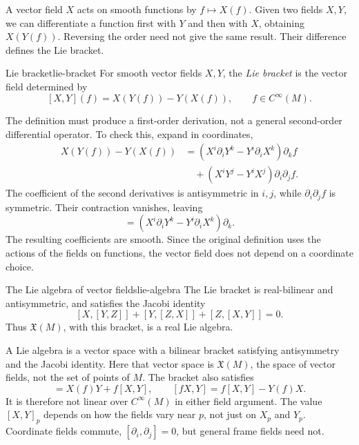 \documentclass[11pt,a4paper]{article}
\numberwithin{equation}{section}
\newcommand{\Cinf}{C^\infty}
\newcommand{\X}{\mathfrak X}
\begin{document}
A vector field \(X\) acts on smooth functions by \(f\mapsto X(f)\).
Given two fields \(X,Y\), we can differentiate a function first with
\(Y\) and then with \(X\), obtaining \(X(Y(f))\). Reversing the order
need not give the same result. Their difference defines the Lie bracket.

\begin{definition}{Lie bracket}{lie-bracket}
For smooth vector fields \(X,Y\), the \emph{Lie bracket} is the
vector field determined by
\[
 [X,Y](f)=X(Y(f))-Y(X(f)),\qquad f\in\Cinf(M).
\]
\end{definition}

The definition must produce a first-order derivation, not a general
second-order differential operator. To check this, expand in coordinates,
\[
 \begin{aligned}
 X(Y(f))-Y(X(f))
 &=(X^i\partial_iY^k-Y^i\partial_iX^k)\partial_kf\\
 &\quad +(X^iY^j-Y^iX^j)\partial_i\partial_jf.
 \end{aligned}
\]
The coefficient of the second derivatives is antisymmetric in \(i,j\),
while \(\partial_i\partial_jf\) is symmetric. Their contraction
vanishes, leaving
\begin{equation}
 [X,Y]=(X^i\partial_iY^k-Y^i\partial_iX^k)\partial_k.
 \label{eq:bracket-components}
\end{equation}
The resulting coefficients are smooth. Since the original definition
uses the actions of the fields on functions, the vector field does not
depend on a coordinate choice.

\begin{proposition}{The Lie algebra of vector fields}{lie-algebra}
The Lie bracket is real-bilinear and antisymmetric, and satisfies the
Jacobi identity
\[
 [X,[Y,Z]]+[Y,[Z,X]]+[Z,[X,Y]]=0.
\]
Thus \(\X(M)\), with this bracket, is a real Lie algebra.
\end{proposition}

A Lie algebra is a vector space with a bilinear bracket satisfying
antisymmetry and the Jacobi identity. Here that vector space is
\(\X(M)\), the space of vector fields, not the set of points of \(M\).
The bracket also satisfies
\begin{equation}
 [X,fY]=X(f)Y+f[X,Y],\qquad
 [fX,Y]=f[X,Y]-Y(f)X.
 \label{eq:bracket-function}
\end{equation}
It is therefore not linear over \(\Cinf(M)\) in either field argument.
The value \([X,Y]_p\) depends on how the fields vary near \(p\), not
just on \(X_p\) and \(Y_p\). Coordinate fields commute,
\([\partial_i,\partial_j]=0\), but general frame fields need not.
\end{document}
